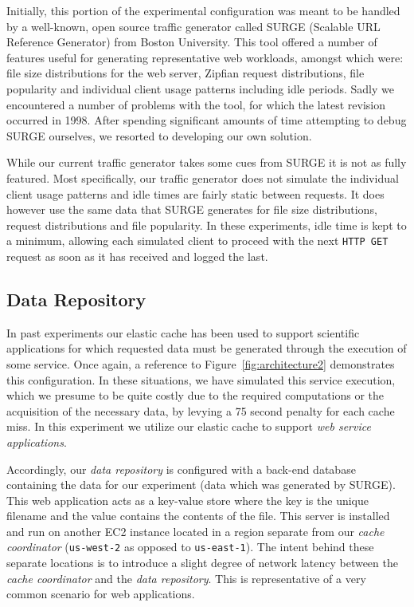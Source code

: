 Initially, this portion of the experimental configuration was meant to be
handled by a well-known, open source traffic generator called SURGE (Scalable
URL Reference Generator) from Boston University\cite{surge}. This tool offered
a number of features useful for generating representative web workloads,
amongst which were: file size distributions for the web server, Zipfian request
distributions, file popularity and individual client usage patterns including
idle periods. Sadly we encountered a number of problems with the tool, for
which the latest revision occurred in 1998. After spending significant amounts
of time attempting to debug SURGE ourselves, we resorted to developing our own
solution.

While our current traffic generator takes some cues from SURGE it is not as
fully featured. Most specifically, our traffic generator does not simulate the
individual client usage patterns and idle times are fairly static between
requests. It does however use the same data that SURGE generates for file size
distributions, request distributions and file popularity. In these experiments,
idle time is kept to a minimum, allowing each simulated client to proceed with
the next {\tt HTTP GET} request as soon as it has received and logged the
last.


\subsection{Data Repository} %
\label{sub:data_repository}
In past experiments our elastic cache has been used to support scientific
applications for which requested data must be generated through the execution
of some service. Once again, a reference to Figure~\ref{fig:architecture2}
demonstrates this configuration. In these situations, we have simulated this
service execution, which we presume to be quite costly due to the required
computations or the acquisition of the necessary data, by levying a 75 second
penalty for each cache miss. In this experiment we utilize our elastic cache to
support \emph{web service applications}.

Accordingly, our \emph{data repository} is configured with a back-end database
containing the data for our experiment (data which was generated by SURGE).
This web application acts as a key-value store where the key is the unique
filename and the value contains the contents of the file. This server is
installed and run on another EC2 instance located in a region separate from our
\emph{cache coordinator} ({\tt us-west-2} as opposed to {\tt us-east-1}). The
intent behind these separate locations is to introduce a slight degree of
network latency between the \emph{cache coordinator} and the \emph{data
repository}. This is representative of a very common scenario for web
applications.

